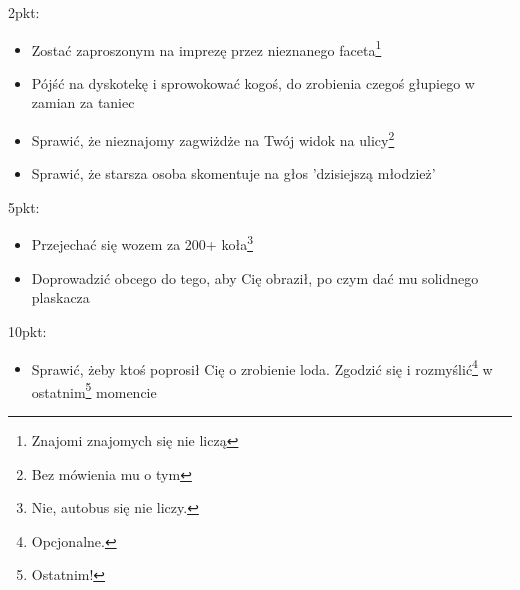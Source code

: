 \documentclass[11pt,a4paper,sans]{moderncv}        %
\begin{document}
2pkt:
\begin{itemize}
	\item Zostać zaproszonym na imprezę przez nieznanego faceta\footnote{Znajomi znajomych się nie liczą}
	\item Pójść na dyskotekę i sprowokować kogoś, do zrobienia czegoś głupiego w zamian za taniec
	\item Sprawić, że nieznajomy zagwiżdże na Twój widok na ulicy\footnote{Bez mówienia mu o tym}
	\item Sprawić, że starsza osoba skomentuje na głos 'dzisiejszą młodzież'
\end{itemize}

5pkt:
\begin{itemize}
	\item Przejechać się wozem za 200+ koła\footnote{Nie, autobus się nie liczy.}
	\item Doprowadzić obcego do tego, aby Cię obraził, po czym dać mu solidnego plaskacza
\end{itemize}

10pkt:
\begin{itemize}
	\item Sprawić, żeby ktoś poprosił Cię o zrobienie loda. Zgodzić się i rozmyślić\footnote{Opcjonalne.} 
		w ostatnim\footnote{Ostatnim!} momencie
\end{itemize}
\end{document}
